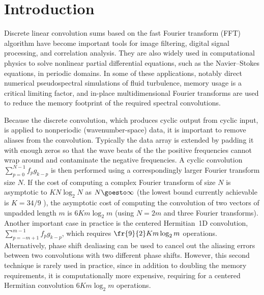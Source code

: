 \documentclass[final]{siamltex}
\begin{document}


\section{Introduction}
Discrete linear convolution sums based on the fast Fourier transform
(FFT) algorithm \cite{Gauss1866,Cooley65} have become important tools
for image filtering, digital signal processing, and correlation
analysis. They are also widely used in computational physics to solve
nonlinear partial differential equations, such as the Navier--Stokes
equations, in periodic domains. In some of these applications, notably
direct numerical pseudospectral simulations of fluid turbulence,
memory usage is a critical limiting factor, and in-place
multidimensional Fourier transforms are used to reduce the memory
footprint of the required spectral convolutions.

Because the discrete convolution, which produces cyclic output from cyclic
input, is applied to nonperiodic (wavenumber-space) data, it is important
to remove aliases from the convolution. Typically the data array is
extended by padding it with enough zeros so that the wave beats of the
the positive frequencies cannot wrap around and contaminate
the negative frequencies. A cyclic convolution $\sum_{p=0}^{N-1} f_p g_{k-p}$ is then performed using a
correspondingly larger Fourier transform size $N$. If the cost of 
computing a complex Fourier transform of size $N$ is asymptotic to 
$K N\log_2 N$ as \hbox{$N\goesto\infty$} (the lowest bound currently 
achievable is $K=34/9$ \cite{Johnson07,Lundy07}), the asymptotic cost of
computing the convolution of two vectors of unpadded length $m$ is
$6Km\log_2 m$ (using $N=2m$ and three Fourier transforms).
Another important case in practice is the centered Hermitian~1D convolution,
$\sum_{p=-m+1}^{m-1} f_p g_{k-p}$, which requires $\fr{9}{2}Km\log_2 m$
operations.
Alternatively, phase shift dealiasing \cite{Patterson71,Canuto} can be used
to cancel out the aliasing errors between two convolutions with two
different phase shifts. However, this second technique is rarely used in
practice, since in addition to doubling the memory requirements, it is
computationally more expensive, requiring for a centered Hermitian convolution
$6K m\log_2 m$ operations.
\end{document}

